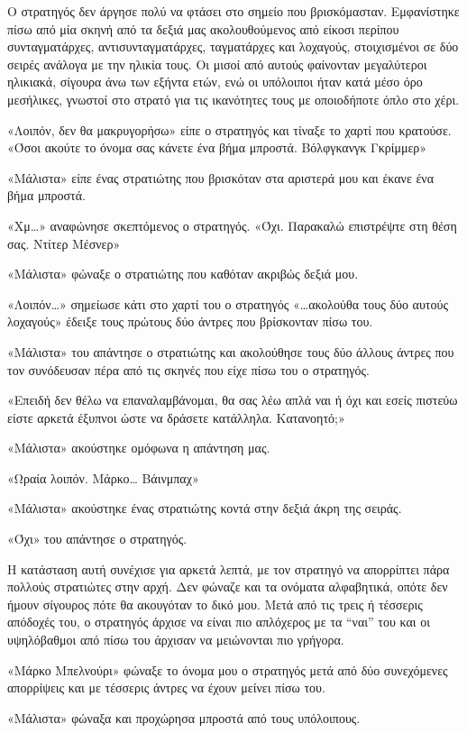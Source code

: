 \documentclass[12pt,twoside, openany]{book}
\begin{document}
Ο στρατηγός δεν άργησε πολύ να φτάσει στο σημείο που βρισκόμασταν. Εμφανίστηκε πίσω από μία σκηνή από τα δεξιά μας ακολουθούμενος από είκοσι περίπου συνταγματάρχες, αντισυνταγματάρχες, ταγματάρχες και λοχαγούς, στοιχισμένοι σε δύο σειρές ανάλογα με την ηλικία τους. Οι μισοί από αυτούς φαίνονταν μεγαλύτεροι ηλικιακά, σίγουρα άνω των εξήντα ετών, ενώ οι υπόλοιποι ήταν κατά μέσο όρο μεσήλικες, γνωστοί στο στρατό για τις ικανότητες τους με οποιοδήποτε όπλο στο χέρι.

«Λοιπόν, δεν θα μακρυγορήσω» είπε ο στρατηγός και τίναξε το χαρτί που κρατούσε. «Όσοι ακούτε το όνομα σας κάνετε ένα βήμα μπροστά. Βόλφγκανγκ Γκρίμμερ»

«Μάλιστα» είπε ένας στρατιώτης που βρισκόταν στα αριστερά μου και έκανε ένα βήμα μπροστά.

«Χμ…» αναφώνησε σκεπτόμενος ο στρατηγός. «Όχι. Παρακαλώ επιστρέψτε στη θέση σας. Ντίτερ Μέσνερ»

«Μάλιστα» φώναξε ο στρατιώτης που καθόταν ακριβώς δεξιά μου.

«Λοιπόν…» σημείωσε κάτι στο χαρτί του ο στρατηγός «…ακολούθα τους δύο αυτούς λοχαγούς» έδειξε τους πρώτους δύο άντρες που βρίσκονταν πίσω του.

«Μάλιστα» του απάντησε ο στρατιώτης και ακολούθησε τους δύο άλλους άντρες που τον συνόδευσαν πέρα από τις σκηνές που είχε πίσω του ο στρατηγός.

«Επειδή δεν θέλω να επαναλαμβάνομαι, θα σας λέω απλά ναι ή όχι και εσείς πιστεύω είστε αρκετά έξυπνοι ώστε να δράσετε κατάλληλα. Κατανοητό;»

«Μάλιστα» ακούστηκε ομόφωνα η απάντηση μας.

«Ωραία λοιπόν. Μάρκο… Βάινμπαχ»

«Μάλιστα» ακούστηκε ένας στρατιώτης κοντά στην δεξιά άκρη της σειράς.

«Όχι» του απάντησε ο στρατηγός.

Η κατάσταση αυτή συνέχισε για αρκετά λεπτά, με τον στρατηγό να απορρίπτει πάρα πολλούς στρατιώτες στην αρχή. Δεν φώναζε και τα ονόματα αλφαβητικά, οπότε δεν ήμουν σίγουρος πότε θα ακουγόταν το δικό μου. Μετά από τις τρεις ή τέσσερις απόδοχές του, ο στρατηγός άρχισε να είναι πιο απλόχερος με τα “ναι” του και οι υψηλόβαθμοι από πίσω του άρχισαν να μειώνονται πιο γρήγορα.

«Μάρκο Μπελνούρι» φώναξε το όνομα μου ο στρατηγός μετά από δύο συνεχόμενες απορρίψεις και με τέσσερις άντρες να έχουν μείνει πίσω του.

«Μάλιστα» φώναξα και προχώρησα μπροστά από τους υπόλοιπους.
\end{document}
